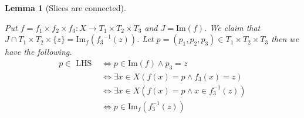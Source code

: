 \documentclass{article}
\theoremstyle{mystyle}
\newtheorem{lem}[thm]{Lemma}
\theoremstyle{remark}
\newtheorem{rmk}{Remark}[section]
\begin{document}
\begin{lem}
    [Slices are connected]
 \label{lem:fibershomeoplanes} 


    Put \(f =  f_{1} \times f_{2} \times f_{3}: X \to T_{1} \times T_{2} \times T_{3} \) and \(J = \text{Im}(f)\). We claim that \(J \cap T_{1} \times T_{2} \times \{z\} = \text{Im}_{f} ({ f_{3}}^{-1}(z))\). Let \(p = (p_{1}, p_{2} , p_{3}) \in T_{1} \times T_{2} \times T_{3}\) then we have the following. 
    \begin{align*}
        p \in \text { LHS } & \Longleftrightarrow p \in \text{Im}(f) \wedge p_{3} = z \\ 
        & \Longleftrightarrow \exists x \in X (f(x)=p \wedge  f_3(x)=z)\\
        & \Longleftrightarrow \exists x \in X (f(x)=p \wedge x \in f_3^{-1} (z))\\
        & \Longleftrightarrow p \in \text{Im}_f(f_3^{-1} (z))
    \end{align*}
\end{lem}
\end{document}
